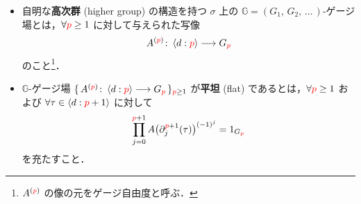 \documentclass[TQFT_main]{subfiles}
\begin{document}
\begin{mydef}[label=def:hg-extended-lattice]{}
    \begin{itemize}
        \item 
        自明な\textbf{高次群} (higher group) の構造を持つ $\sigma$ 上の $\mathbb{G} = (G_1,\, G_2,\, \dots\, )$-ゲージ場とは，$\forall \textcolor{red}{p} \ge 1$ に対して与えられた写像
        \begin{align}
            \label{eq:hg-p-A}
            A^{(\textcolor{red}{p})} \colon \expval{d:\textcolor{red}{p}} \longrightarrow G_{\textcolor{red}{p}}
        \end{align}
        のこと\footnote{$A^{(\textcolor{red}{p})}$ の像の元をゲージ自由度と呼ぶ．}．
        \item 
        $\mathbb{G}$-ゲージ場 $\{\, A^{(\textcolor{red}{p})} \colon \expval{d:\textcolor{red}{p}} \longrightarrow G_{\textcolor{red}{p}}  \,\}_{\textcolor{red}{p} \ge 1}$ が\textbf{平坦} (flat) であるとは，$\forall \textcolor{red}{p} \ge 1$ および $\forall \tau \in \expval{d:\textcolor{red}{p}+1}$ に対して
        \begin{align}
            \label{eq:simphg-flat}
            \prod_{j=0}^{\textcolor{red}{p}+1} A\bigl(\partial_j^{\textcolor{red}{p}+1}(\tau)\bigr)^{(-1)^j} = 1_{G_{\textcolor{red}{p}}}
        \end{align}
        を充たすこと．
    \end{itemize}
\end{mydef}
\end{document}
